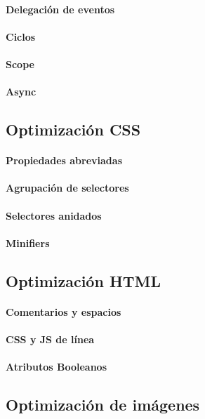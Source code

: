 \documentclass[12pt]{report}
\begin{document}
			\paragraph{Delegación de eventos}
			\paragraph{Ciclos}
			\paragraph{Scope}
			\paragraph{Async}
		\subsection{Optimización CSS}
			\paragraph{Propiedades abreviadas}
			\paragraph{Agrupación de selectores}
			\paragraph{Selectores anidados}
			\paragraph{Minifiers}
		\subsection{Optimización HTML}
			\paragraph{Comentarios y espacios}
			\paragraph{CSS y JS de línea}
			\paragraph{Atributos Booleanos}
		\subsection{Optimización de imágenes}
\end{document}
